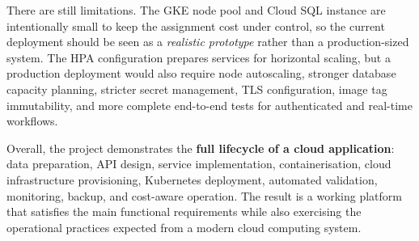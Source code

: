 There are still limitations. The GKE node pool and Cloud SQL instance are intentionally small to keep the assignment cost under control, so the current deployment should be seen as a \textit{realistic prototype} rather than a production-sized system. The HPA configuration prepares services for horizontal scaling, but a production deployment would also require node autoscaling, stronger database capacity planning, stricter secret management, TLS configuration, image tag immutability, and more complete end-to-end tests for authenticated and real-time workflows.

Overall, the project demonstrates the \textbf{full lifecycle of a cloud application}: data preparation, API design, service implementation, containerisation, cloud infrastructure provisioning, Kubernetes deployment, automated validation, monitoring, backup, and cost-aware operation. The result is a working platform that satisfies the main functional requirements while also exercising the operational practices expected from a modern cloud computing system.
